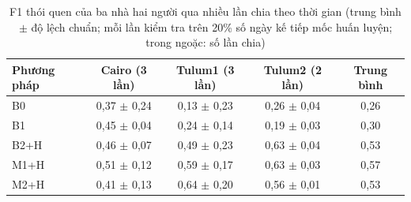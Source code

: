 \begin{table}[htbp]
\centering
\caption{F1 thói quen của ba nhà hai người qua nhiều lần chia theo thời gian (trung bình $\pm$ độ lệch chuẩn; mỗi lần kiểm tra trên 20\% số ngày kế tiếp mốc huấn luyện; trong ngoặc: số lần chia)}
\label{tab:rolling}
\small
\begin{tabular}{lcccc}
\toprule
Phương pháp & Cairo (3 lần) & Tulum1 (3 lần) & Tulum2 (2 lần) & Trung bình \\
\midrule
B0 & 0{,}37 $\pm$ 0{,}24 & 0{,}13 $\pm$ 0{,}23 & 0{,}26 $\pm$ 0{,}04 & 0{,}26 \\
B1 & 0{,}45 $\pm$ 0{,}04 & 0{,}24 $\pm$ 0{,}14 & 0{,}19 $\pm$ 0{,}03 & 0{,}30 \\
B2+H & 0{,}46 $\pm$ 0{,}07 & 0{,}49 $\pm$ 0{,}23 & 0{,}63 $\pm$ 0{,}04 & 0{,}53 \\
M1+H & 0{,}51 $\pm$ 0{,}12 & 0{,}59 $\pm$ 0{,}17 & 0{,}63 $\pm$ 0{,}03 & 0{,}57 \\
M2+H & 0{,}41 $\pm$ 0{,}13 & 0{,}64 $\pm$ 0{,}20 & 0{,}56 $\pm$ 0{,}01 & 0{,}53 \\
\bottomrule
\end{tabular}
\end{table}
